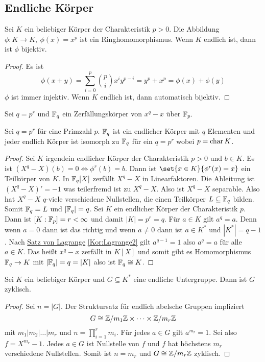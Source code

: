 \subsection{Endliche Körper}
\begin{Lemma}
    Sei \(K\) ein beliebiger Körper der Charakteristik \(p>0\). Die Abbildung \(\phi\colon K\to K,\ \phi(x)=x^p\) ist ein Ringhomomorphismus. Wenn \(K\) endlich ist, dann ist \(\phi\) bijektiv.
\end{Lemma}
\begin{proof}
    Es ist \[\phi(x+y)=\sum_{i=0}^p\binom{p}{i}x^iy^{p-i}=y^p+x^p=\phi(x)+\phi(y)\]
    \(\phi\) ist immer injektiv. Wenn \(K\) endlich ist, dann automatisch bijektiv.
\end{proof}
\begin{Def}
    Sei \(q=p^r\) und \(\mathbb{F}_q\) ein Zerfällungskörper von \(x^q-x\) über \(\mathbb{F}_p.\)
\end{Def}
\begin{Satz} Sei \(q=p^r\) für eine Primzahl \(p\).
    \(\mathbb{F}_q\) ist ein endlicher Körper mit \(q\) Elementen und jeder endlich Körper ist isomorph zu \(\mathbb{F}_q\) für ein \(q=p^r\) wobei \(p=\operatorname{char} K\).
\end{Satz}
\begin{proof}
    Sei \(K\) irgendein endlicher Körper der Charakteristik \(p>0\) und \(b\in K\). Es ist \((X^q-X)(b)=0\iff \phi^r(b)=b\). Dann ist \(\set{x\in K}{ \phi^r(x)=x}\) ein Teilkörper von \(K\).
    In \(\mathbb{F}_q[X]\) zerfällt \(X^q-X\) in Linearfaktoren. Die Ableitung ist \((X^q-X)'=-1\) was teilerfremd ist zu \(X^q-X\). Also ist \(X^q-X\) separable. Also hat \(X^q-X\) \(q\)-viele verschiedene Nullstellen, die einen Teilkörper \(L\subseteq \mathbb{F}_q\) bilden. Somit \(\mathbb{F}_q=L\) und \(|\mathbb{F}_q|=q\).
    Sei \(K\) ein endlicher Körper der Charakteristik \(p\). Dann ist \([K:\mathbb{F}_p]=r<\infty\) und damit \(|K|=p^r=q\).
    Für \(a\in K\) gilt \(a^q=a\). Denn wenn \(a=0\) dann ist das richtig und wenn \(a\neq 0\) dann ist \(a\in K^*\) und \(|K^*|=q-1\). Nach \hyperref[Kor:Lagrange2]{ Satz von Lagrange} \ref{Kor:Lagrange2} gilt \(a^{q-1}=1\) also \(a^q=a\) für alle \(a\in K\). Das heißt \(x^q-x\) zerfällt in \(K[X]\) und somit gibt es Homomorphismus \(\mathbb{F}_q\to K\) mit \(|\mathbb{F}_q|=q=|K|\) also ist \(\mathbb{F}_q\cong K\).
\end{proof}
\begin{Satz}
    Sei \(K\) ein beliebiger Körper und \(G\subseteq K^*\) eine endliche Untergruppe. Dann ist \(G\) zyklisch.
\end{Satz}
\begin{proof}
    Sei \(n=|G|\). Der Struktursatz für endlich abelsche Gruppen impliziert 
    \[G\cong \mathbb{Z}/m_1\mathbb{Z}\times \dots\times \mathbb{Z}/m_r\mathbb{Z}\] mit \(m_1|m_2|\dots| m_r\) und \(n=\prod_{i=1}^rm_i\).
    Für jedes \(a\in G\) gilt \(a^{m_r}=1\). Sei also \(f=X^{m_r}-1\). Jedes \(a\in G\) ist Nullstelle von \(f\) und \(f\) hat höchstens \(m_r\) verschiedene Nullstellen. Somit ist \(n=m_r\) und \(G\cong \mathbb{Z}/m_r\mathbb{Z}\) zyklisch.

\end{proof}

